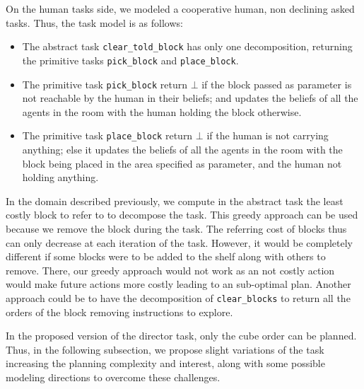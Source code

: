 \documentclass[a4paper,11pt,twoside]{StyleThese}
\begin{document}
On the human tasks side, we modeled a cooperative human, non declining asked tasks. Thus, the task model is as follows:
\begin{itemize}
\item The abstract task \verb'clear_told_block' has only one decomposition, returning the primitive tasks \verb'pick_block' and \verb'place_block'.
\item The primitive task \verb'pick_block' return $\bot$ if the block passed as parameter is not reachable by the human in their beliefs; and updates the beliefs of all the agents in the room with the human holding the block otherwise.
\item The primitive task \verb'place_block' return $\bot$ if the human is not carrying anything; else it updates the beliefs of all the agents in the room with the block being placed in the area specified as parameter, and the human not holding anything.
\end{itemize}

In the domain described previously, we compute in the abstract task the least costly block to refer to to decompose the task. This greedy approach can be used because we remove the block during the task. The referring cost of blocks thus can only decrease at each iteration of the task. However, it would be completely different if some blocks were to be added to the shelf along with others to remove. There, our greedy approach would not work as an not costly action would make future actions more costly leading to an sub-optimal plan. Another approach could be to have the decomposition of \verb'clear_blocks' to return all the orders of the block removing instructions to explore.

In the proposed version of the director task, only the cube order can be planned. Thus, in the following subsection, we propose slight variations of the task increasing the planning complexity and interest, along with some possible modeling directions to overcome these challenges.
\end{document}
